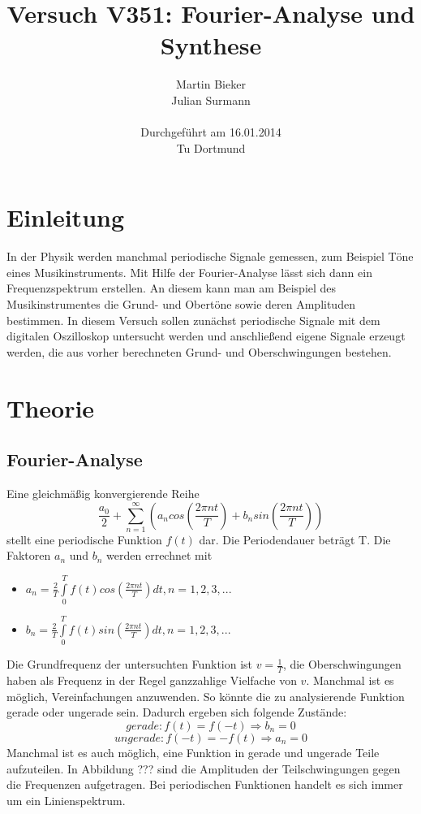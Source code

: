 \documentclass[11pt,ngerman,a4paper]{article}
\title{\textbf{Versuch V351: Fourier-Analyse und Synthese}}
\author{Martin Bieker\\
		Julian Surmann\\
		\\
		Durchgef\"{u}hrt am 16.01.2014\\
		Tu Dortmund}
\date{}
\begin{document}
\renewcommand\tablename{Tabelle}
\renewcommand\figurename{Abbildung}
\maketitle
\thispagestyle{empty}
\newpage
\clearpage
\setcounter{page}{1}


\section{Einleitung}
In der Physik werden manchmal periodische Signale gemessen, zum Beispiel Töne eines Musikinstruments. Mit Hilfe der Fourier-Analyse lässt sich dann ein Frequenzspektrum erstellen. An diesem kann man am Beispiel des Musikinstrumentes die Grund- und Obertöne sowie deren Amplituden bestimmen.
In diesem Versuch sollen zunächst periodische Signale mit dem digitalen Oszilloskop untersucht werden und anschließend eigene Signale erzeugt werden, die aus vorher berechneten Grund- und Oberschwingungen bestehen.
\section{Theorie}
\subsection{Fourier-Analyse}
Eine gleichmäßig konvergierende Reihe
\begin{equation}
\frac{a_0}{2}+\sum_{n=1}^\infty \left(a_ncos\left(\frac{2\pi nt}{T}\right)+b_nsin\left(\frac{2\pi nt}{T}\right)\right)
\label{formel1}
\end{equation}
stellt eine periodische Funktion $f(t)$ dar. Die Periodendauer beträgt T. Die Faktoren $a_n$ und $b_n$ werden errechnet mit
\begin{itemize}
\item $a_n=\frac{2}{T}\int\limits_{0}^{T}f(t)cos\left(\frac{2\pi nt}{T}\right)dt , n = 1,2,3,... $
\item $b_n=\frac{2}{T}\int\limits_{0}^{T}f(t)sin\left(\frac{2\pi nt}{T}\right)dt , n = 1,2,3,... $
\end{itemize}
Die Grundfrequenz der untersuchten Funktion ist $v=\frac{1}{T}$, die Oberschwingungen haben als Frequenz in der Regel ganzzahlige Vielfache von $v$.
Manchmal ist es möglich, Vereinfachungen anzuwenden. So könnte die zu analysierende Funktion gerade oder ungerade sein. Dadurch ergeben sich folgende Zustände:
\begin{equation}
gerade: f(t)=f(-t) \Rightarrow b_n=0
\end{equation}
\begin{equation}
ungerade: f(-t)=-f(t) \Rightarrow a_n=0
\end{equation}
Manchmal ist es auch möglich, eine Funktion in gerade und ungerade Teile aufzuteilen. In Abbildung ??? sind die Amplituden der Teilschwingungen gegen die Frequenzen aufgetragen. Bei periodischen Funktionen handelt es sich immer um ein Linienspektrum.
\end{document}
